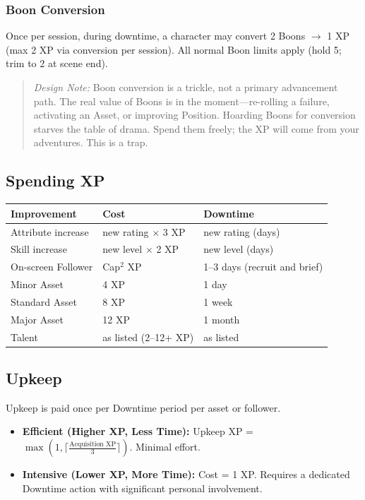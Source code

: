 \subsubsection{Boon Conversion}
Once per session, during downtime, a character may convert 2 Boons $\rightarrow$ 1 XP (max 2 XP via conversion per session). All normal Boon limits apply (hold 5; trim to 2 at scene end).

\begin{quote}
\emph{Design Note:} Boon conversion is a trickle, not a primary advancement path. The real value of Boons is in the moment---re-rolling a failure, activating an Asset, or improving Position. Hoarding Boons for conversion starves the table of drama. Spend them freely; the XP will come from your adventures. This is a trap.
\end{quote}

\subsection{Spending XP}

\begin{tabular}{@{}lp{3.8cm}p{5cm}@{}}
\toprule
\textbf{Improvement} & \textbf{Cost} & \textbf{Downtime} \\
\midrule
Attribute increase & new rating $\times$ 3 XP & new rating (days) \\
Skill increase & new level $\times$ 2 XP & new level (days) \\
On-screen Follower & Cap$^2$ XP & 1--3 days (recruit and brief) \\
Minor Asset & 4 XP & 1 day \\
Standard Asset & 8 XP & 1 week \\
Major Asset & 12 XP & 1 month \\
Talent & as listed (2--12+ XP) & as listed \\
\bottomrule
\end{tabular}

\subsection{Upkeep}

Upkeep is paid once per Downtime period per asset or follower.

\begin{itemize}
  \item \textbf{Efficient (Higher XP, Less Time):} Upkeep XP = $\max(1, \lceil \frac{\text{Acquisition XP}}{3} \rceil)$. Minimal effort.
  \item \textbf{Intensive (Lower XP, More Time):} Cost = 1 XP. Requires a dedicated Downtime action with significant personal involvement.
\end{itemize}

